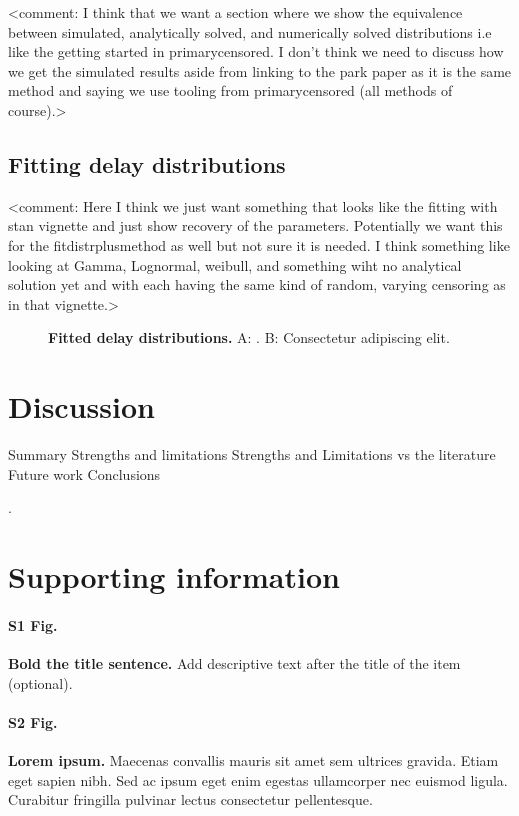 \documentclass[10pt,letterpaper]{article}
\begin{document}
<comment: I think that we want a section where we show the equivalence between simulated, analytically solved, and numerically solved distributions i.e like the getting started in primarycensored. I don't think we need to discuss how we get the simulated results aside from linking to the park paper as it is the same method and saying we use tooling from primarycensored (all methods of course).>

\subsection{Fitting delay distributions}

<comment: Here I think we just want something that looks like the fitting with stan vignette and just show recovery of the parameters. Potentially we want this for the fitdistrplusmethod as well but not sure it is needed. 
I think something like looking at Gamma, Lognormal, weibull, and something wiht no analytical solution yet and with each having the same kind of random, varying censoring as in that vignette.>
\begin{figure}[!h]
\caption{{\bf Fitted delay distributions.}
A: . B: Consectetur adipiscing elit.}
\label{fig1}
\end{figure}


\section*{Discussion}
Summary
Strengths and limitations 
Strengths and Limitations vs the literature
Future work
Conclusions


 
 
.

\section*{Supporting information}

\paragraph*{S1 Fig.}
\label{S1_Fig}
{\bf Bold the title sentence.} Add descriptive text after the title of the item (optional).

\paragraph*{S2 Fig.}
\label{S2_Fig}
{\bf Lorem ipsum.} Maecenas convallis mauris sit amet sem ultrices gravida. Etiam eget sapien nibh. Sed ac ipsum eget enim egestas ullamcorper nec euismod ligula. Curabitur fringilla pulvinar lectus consectetur pellentesque.
\end{document}
